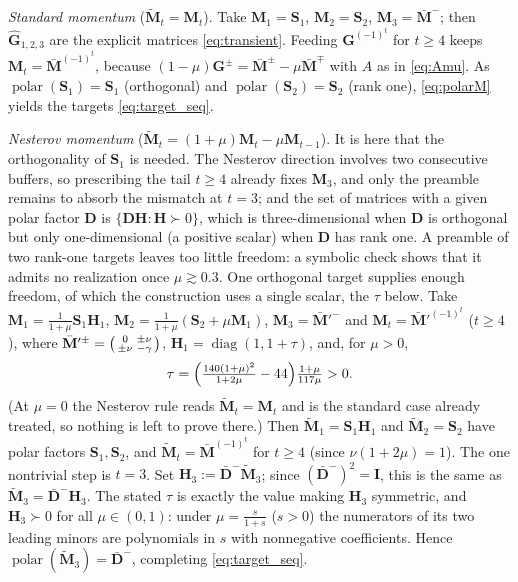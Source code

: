 \emph{Standard momentum} ($\tilde{\mathbf M}_t=\mathbf M_t$). Take
$\mathbf M_1=\mathbf S_1$, $\mathbf M_2=\mathbf S_2$,
$\mathbf M_3=\bar{\mathbf M}^{-}$; then $\hat{\mathbf G}_{1,2,3}$ are the
explicit matrices \eqref{eq:transient}. Feeding $\mathbf G^{(-1)^t}$ for $t\ge4$
keeps $\mathbf M_t=\bar{\mathbf M}^{(-1)^t}$, because
$(1-\mu)\mathbf G^{\pm}=\bar{\mathbf M}^{\pm}-\mu\bar{\mathbf M}^{\mp}$ with $A$
as in \eqref{eq:Amu}. As $\operatorname{polar}(\mathbf S_1)=\mathbf S_1$
(orthogonal) and $\operatorname{polar}(\mathbf S_2)=\mathbf S_2$ (rank one),
\eqref{eq:polarM} yields the targets \eqref{eq:target_seq}.

\emph{Nesterov momentum} ($\tilde{\mathbf M}_t=(1+\mu)\mathbf M_t-\mu\mathbf M_{t-1}$).
It is here that the orthogonality of $\mathbf S_1$ is needed. The Nesterov
direction involves two consecutive buffers, so prescribing the tail $t\ge4$
already fixes $\mathbf M_3$, and only the preamble remains to absorb the
mismatch at $t=3$; and the set of matrices with a given polar factor
$\mathbf D$ is $\{\mathbf D\mathbf H:\mathbf H\succ0\}$, which is
three-dimensional when $\mathbf D$ is orthogonal but only one-dimensional (a
positive scalar) when $\mathbf D$ has rank one. A preamble of two rank-one
targets leaves too little freedom: a symbolic check shows that it admits no
realization once $\mu\gtrsim0.3$. One orthogonal target supplies enough
freedom, of which the construction uses a single scalar, the $\tau$ below.
Take $\mathbf M_1=\tfrac1{1+\mu}\mathbf S_1\mathbf H_1$,
$\mathbf M_2=\tfrac1{1+\mu}(\mathbf S_2+\mu\mathbf M_1)$,
$\mathbf M_3=\bar{\mathbf M}'^{-}$ and $\mathbf M_t=\bar{\mathbf M}'^{(-1)^t}$
($t\ge4$), where $\bar{\mathbf M}'^{\pm}=\bigl(\begin{smallmatrix}0&\pm\nu\\\pm\nu&-\gamma\end{smallmatrix}\bigr)$,
$\mathbf H_1=\operatorname{diag}(1,1+\tau)$, and, for $\mu>0$,
\[
\tau=\Bigl(\tfrac{140(1+\mu)^2}{1+2\mu}-44\Bigr)\tfrac{1+\mu}{117\mu}>0 .
\]
(At $\mu=0$ the Nesterov rule reads $\tilde{\mathbf M}_t=\mathbf M_t$ and is the standard case already treated, so nothing is left to prove there.)
Then $\tilde{\mathbf M}_1=\mathbf S_1\mathbf H_1$ and
$\tilde{\mathbf M}_2=\mathbf S_2$ have polar factors $\mathbf S_1,\mathbf S_2$,
and $\tilde{\mathbf M}_t=\bar{\mathbf M}^{(-1)^t}$ for $t\ge4$ (since
$\nu(1+2\mu)=1$). The one nontrivial step is $t=3$. Set
$\mathbf H_3:=\bar{\mathbf D}^{-}\tilde{\mathbf M}_3$; since
$(\bar{\mathbf D}^{-})^2=\mathbf I$, this is the same as
$\tilde{\mathbf M}_3=\bar{\mathbf D}^{-}\mathbf H_3$. The stated $\tau$ is
exactly the value making $\mathbf H_3$ symmetric,
and $\mathbf H_3\succ0$ for all $\mu\in(0,1)$: under $\mu=\tfrac{s}{1+s}$ ($s>0$)
the numerators of its two leading minors are polynomials in $s$ with
nonnegative coefficients. Hence
$\operatorname{polar}(\tilde{\mathbf M}_3)=\bar{\mathbf D}^{-}$, completing
\eqref{eq:target_seq}.


